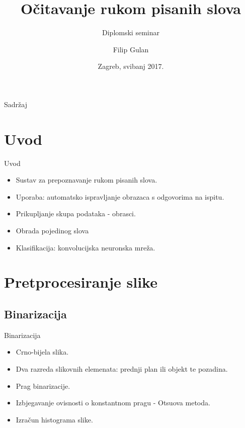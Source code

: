 \documentclass{beamer}
\author{Filip Gulan}
\title{Očitavanje rukom pisanih slova}
\subtitle{Diplomski seminar}
\institute[FER]{Sveučilište u Zagrebu \\ Fakultet elektrotehnike i računarstva}
\date{Zagreb, svibanj 2017.}
\begin{document}
\begin{frame}
\maketitle
\end{frame}

\begin{frame}{Sadržaj}
  \tableofcontents
\end{frame}


\section{Uvod}
\begin{frame}{Uvod}
  \begin{itemize}
      \item {
        Sustav za prepoznavanje rukom pisanih slova.
      }
      \item{
        Uporaba: automatsko ispravljanje obrazaca s odgovorima na ispitu.
      }
      \item{
        Prikupljanje skupa podataka - obrasci.
      }
      \item{
        Obrada pojedinog slova
      }
      \item{
        Klasifikacija: konvolucijska neuronska mreža.
      }
  \end{itemize}
\end{frame}

\section{Pretprocesiranje slike}

\subsection{Binarizacija}

\begin{frame}{Binarizacija}
  \begin{itemize}
  \item {
    Crno-bijela slika.
    \pause %
  }
  \item {
    Dva razreda slikovnih elemenata: prednji plan ili objekt te pozadina.
    \pause %
  }
  \item {   
    Prag binarizacije.
    \pause
  }
  \item {   
    Izbjegavanje ovisnosti o konstantnom pragu - Otsuova metoda.
    \pause
  }
    \item {
    Izračun histograma slike.
  }
  \end{itemize}
\end{frame}
\end{document}
